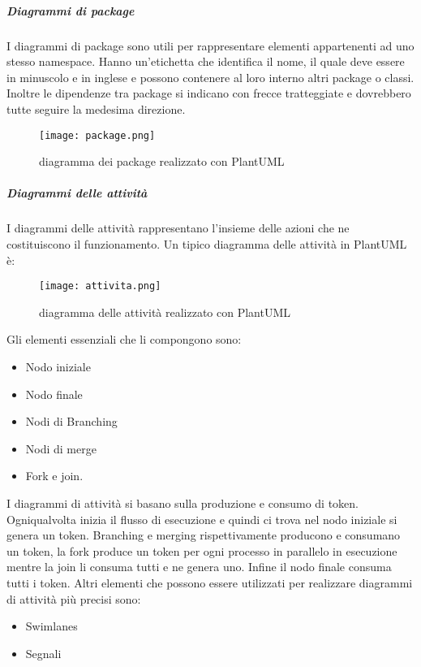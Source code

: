 \documentclass[../../norme-di-progetto.tex]{subfiles}
\begin{document}
\subparagraph{Diagrammi di package}%
\label{subp:diagrammi_di_package}
I diagrammi di package sono utili per rappresentare elementi appartenenti ad uno stesso namespace.
Hanno un'etichetta che identifica il nome, il quale deve essere in minuscolo e in inglese e possono contenere al loro interno altri package o classi.
Inoltre le dipendenze tra package si indicano con frecce tratteggiate e dovrebbero tutte seguire la medesima direzione.
\begin{figure}[H]%
  \label{fig:package}
  \texttt{[image: package.png]}
  \centering
  \caption{diagramma dei package realizzato con PlantUML}
\end{figure}

\subparagraph{Diagrammi delle attività}%
\label{diagrammi_delle_attivita}%
I diagrammi delle attività rappresentano l'insieme delle azioni che ne costituiscono il funzionamento. Un tipico diagramma delle attività in PlantUML è:
\begin{figure}[H]%
  \label{fig:attività}
  \texttt{[image: attivita.png]}
  \centering
  \caption{diagramma delle attività realizzato con PlantUML}
\end{figure}
Gli elementi essenziali che li compongono sono:
\begin{itemize}
  \item Nodo iniziale
  \item Nodo finale
  \item Nodi di Branching
  \item Nodi di merge
  \item Fork e join.
\end{itemize}
I diagrammi di attività si basano sulla produzione e consumo di token.
Ogniqualvolta inizia il flusso di esecuzione e quindi ci trova nel nodo iniziale si genera un token.
Branching e merging rispettivamente producono e consumano un token, la fork produce un token per ogni processo in parallelo in esecuzione mentre la join li consuma tutti e ne genera uno.
Infine il nodo finale consuma tutti i token.
Altri elementi che possono essere utilizzati per realizzare diagrammi di attività più precisi sono:
\begin{itemize}
  \item Swimlanes
  \item Segnali
\end{itemize}
\end{document}
